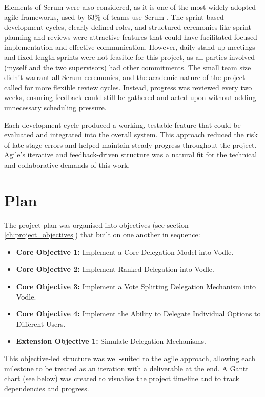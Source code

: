 Elements of Scrum were also considered, as it is one of the most widely adopted agile frameworks, used by 63\% of teams use Scrum \citep{versionone2020stateofagile}. The sprint-based development cycles, clearly defined roles, and structured ceremonies like sprint planning and reviews were attractive features that could have facilitated focused implementation and effective communication. However, daily stand-up meetings and fixed-length sprints were not feasible for this project, as all parties involved (myself and the two supervisors) had other commitments. The small team size didn't warrant all Scrum ceremonies, and the academic nature of the project called for more flexible review cycles. Instead, progress was reviewed every two weeks, ensuring feedback could still be gathered and acted upon without adding unnecessary scheduling pressure.

Each development cycle produced a working, testable feature that could be evaluated and integrated into the overall system. This approach reduced the risk of late-stage errors and helped maintain steady progress throughout the project. Agile's iterative and feedback-driven structure was a natural fit for the technical and collaborative demands of this work.
\section{Plan}

The project plan was organised into objectives (see section \ref{ch:project_objectives}) that built on one another in sequence:

\begin{itemize}
    \item \textbf{Core Objective 1:} Implement a Core Delegation Model into Vodle.
    \item \textbf{Core Objective 2:} Implement Ranked Delegation into Vodle.
    \item \textbf{Core Objective 3:} Implement a Vote Splitting Delegation Mechanism into Vodle.
    \item \textbf{Core Objective 4:} Implement the Ability to Delegate Individual Options to Different Users.
    \item \textbf{Extension Objective 1:} Simulate Delegation Mechanisms.
\end{itemize}

This objective-led structure was well-suited to the agile approach, allowing each milestone to be treated as an iteration with a deliverable at the end. A Gantt chart (see below) was created to visualise the project timeline and to track dependencies and progress.

